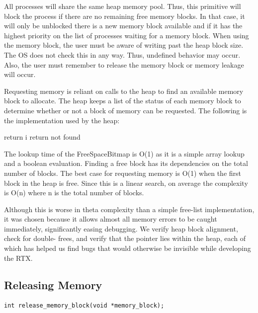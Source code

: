 \documentclass[12pt]{report}
\begin{document}
\par All processes will share the same heap memory pool. Thus, this primitive will block the process if there are no remaining free memory blocks. In that case, it will only be unblocked there is a new memory block available and if it has the highest priority on the list of processes waiting for a memory block. When using the memory block, the user must be aware of writing past the heap block size. The OS does not check this in any way. Thus, undefined behavior may occur. Also, the user must remember to release the memory block or memory leakage will occur.

\par Requesting memory is reliant on calls to the heap to find an available memory block to allocate. The heap keeps a list of the status of each memory block to determine whether or not a block of memory can be requested. The following is the implementation used by the heap:
\begin{algorithmic}
        \State return i
      \EndIf
    \EndFor
  \State return not found
  \EndFunction
\end{algorithmic}

The lookup time of the FreeSpaceBitmap is O(1) as it is a simple array lookup and a boolean evaluation. Finding a free block has its dependencies on the total number of blocks. The best case for requesting memory is O(1) when the first block in the heap is free. Since this is a linear search, on average the complexity is O(n) where n is the total number of blocks.

Although this is worse in theta complexity than a simple free-list implementation,
it was chosen because it allows almost all memory errors to be caught immediately,
significantly easing debugging. We verify heap block alignment, check for double-
frees, and verify that the pointer lies within the heap, each of which has helped
us find bugs that would otherwise be invisible while developing the RTX.

\bigskip

\subsection{Releasing Memory}
\begin{lstlisting}
int release_memory_block(void *memory_block);
\end{lstlisting}
\end{document}
